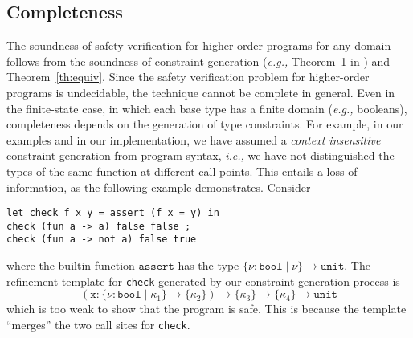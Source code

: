 \documentclass[nocopyrightspace]{sigplanconf}
\def\set#1{{\{ #1\}}}
\newcommand{\ie}{\textit{i.e.,}\xspace}
\newcommand{\eg}{\textit{e.g.,}\xspace}
\newcommand{\ttx}{\mathtt{x}}
\def\valu{\nu}
\newcommand{\ftyp}[2]{{{#1}\!:\!{#2}}}
\newcommand{\ASSERT}[2]{\{{#1}\}\ {#2}}
\def\ttbool{\mathtt{bool}}
\newcommand{\ttunit}{\mathtt{unit}}
\newcommand{\reftyp}[3]{\set{\ftyp{{#1}}{{#2}} \mid {#3}}}
\def\ASSERT{{{\mathtt{assert}}}}
\begin{document}
\subsection{Completeness}

The soundness of safety verification for higher-order programs 
for any domain follows from the soundness of constraint generation 
(\eg Theorem~1 in \cite{LiquidPLDI08}) and Theorem~\ref{th:equiv}. Since the safety verification problem for higher-order programs
is undecidable, the technique cannot be complete in general.
Even in the finite-state case, in which
each base type has a finite domain (\eg booleans), 
completeness depends on the generation of type constraints.
For example, in our examples and in our implementation, we have
assumed a \emph{context insensitive} constraint generation from program
syntax, \ie we have not distinguished the types of the same function
at different call points.
This entails a loss of information, as the following example demonstrates.
Consider
\begin{verbatim}
let check f x y = assert (f x = y) in
check (fun a -> a) false false ;
check (fun a -> not a) false true
\end{verbatim}
where the builtin function $\ASSERT$ has the type 
$\reftyp{\valu}{\ttbool}{\valu} \rightarrow \ttunit$.
The refinement template for \verb+check+ 
generated by our constraint generation process is 
\[
(\ttx: \reftyp{\valu}{\ttbool}{\kappa_1}\rightarrow \set{\kappa_2}) \rightarrow \set{\kappa_3} \rightarrow \set{\kappa_4}\rightarrow \ttunit
\]
which is too weak to show that the program is safe.
This is because the template ``merges'' the two call sites for \verb+check+.
\end{document}

